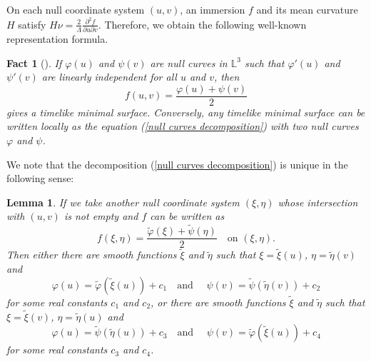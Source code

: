 \documentclass[11pt,reqno]{amsart}
\theoremstyle{plain} %
\newtheorem{lemma}[theorem]{Lemma}
\newtheorem{fact}[theorem]{Fact}
\theoremstyle{definition}
\begin{document}
 
On each null coordinate system $(u,v)$, an immersion $f$ and its mean curvature $H$ satisfy $H\nu=\frac{2}{\Lambda}\frac{\partial^2 f}{\partial u \partial v}$. Therefore, we obtain the following well-known representation formula.
\begin{fact}[\cite{McNertney}]\label{Fact:McNertney}
If $\varphi(u)$ and $\psi(v)$ are null curves in $\mathbb{L}^3$ such that $\varphi'(u)$ and $\psi'(v)$ are linearly independent for all $u$ and $v$, then
\begin{equation}\label{null curves decomposition}
f(u,v)=\frac{\varphi(u)+\psi(v)}{2}
 \end{equation}
gives a timelike minimal surface. Conversely, any timelike minimal surface can be written locally as the equation (\ref{null curves decomposition}) with two null curves $\varphi$ and $\psi$.
\end{fact}
We note that the decomposition (\ref{null curves decomposition}) is unique in the following sense: 
\begin{lemma}\label{null curves decomposition2}
If we take another null coordinate system $(\xi, \eta)$ whose intersection with $(u,v)$ is not empty and $f$ can be written as 
\begin{equation*}
f(\xi,\eta)=\frac{\tilde{\varphi}(\xi)+\tilde{\psi}(\eta)}{2}\quad \text{on $(\xi, \eta)$.}
 \end{equation*}
 Then either there are smooth functions $\tilde{\xi}$ and $\tilde{\eta}$ such that $\xi=\tilde{\xi}(u)$, $\eta=\tilde{\eta}(v)$ and 
 \begin{equation*}
 \varphi(u)=\tilde{\varphi}(\tilde{\xi}(u))+c_1\quad \text{and }\quad \psi(v)=\tilde{\psi}(\tilde{\eta}(v))+c_2
\end{equation*}
for some real constants $c_1$ and $c_2$, or there are smooth functions $\tilde{\xi}$ and $\tilde{\eta}$ such that $\xi=\tilde{\xi}(v)$, $\eta=\tilde{\eta}(u)$ and 
 \begin{equation*}
 \varphi(u)=\tilde{\psi}(\tilde{\eta}(u))+c_3\quad \text{and }\quad \psi(v)=\tilde{\varphi}(\tilde{\xi}(u))+c_4
\end{equation*}
for some real constants $c_3$ and $c_4$.
\end{lemma}
\end{document}
